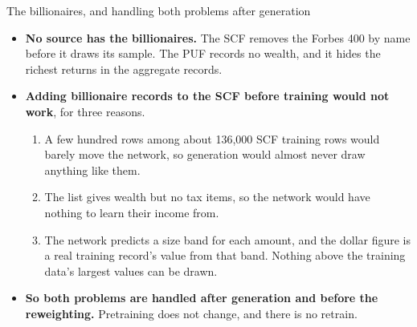 \begin{frame}{The billionaires, and handling both problems after generation}
  \footnotesize
  \begin{itemize}
    \item \textbf{No source has the billionaires.} The SCF removes the Forbes 400 by name before it draws
          its sample. The PUF records no wealth, and it hides the richest returns in the aggregate records.
    \vspace{0.4em}
    \item \textbf{Adding billionaire records to the SCF before training would not work}, for three reasons.
    \begin{enumerate}
      \item A few hundred rows among about 136,000 SCF training rows would barely move the network, so
            generation would almost never draw anything like them.
      \item The list gives wealth but no tax items, so the network would have nothing to learn their
            income from.
      \item The network predicts a size band for each amount, and the dollar figure is a real training
            record's value from that band. Nothing above the training data's largest values can be drawn.
    \end{enumerate}
    \vspace{0.4em}
    \item \textbf{So both problems are handled after generation and before the reweighting.} Pretraining
          does not change, and there is no retrain.
  \end{itemize}
\end{frame}


